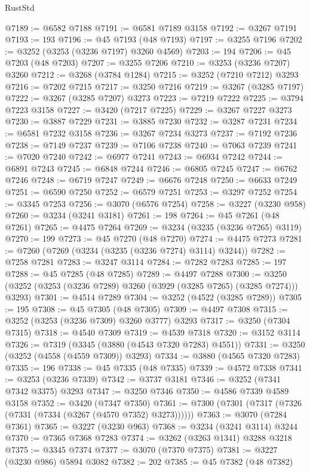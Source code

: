 \begin{lexlean}{RustStd}
\begin{coremodule}
@7189 := @6582 @7188
@7191 := @6581 @7189 @3158
@7192 := @3267 @7191
@7193 := 193
@7196 := @45 @7193 (@48 @7193)
@7197 := @3255 @7196
@7202 := @3252 (@3253 (@3236 @7197) @3260 @4569)
@7203 := 194
@7206 := @45 @7203 (@48 @7203)
@7207 := @3255 @7206
@7210 := @3253 (@3236 @7207) @3260
@7212 := @3268 (@3784 @1284)
@7215 := @3252 (@7210 @7212) @3293
@7216 := @7202 @7215
@7217 := @3250 @7216
@7219 := @3267 (@3285 @7197)
@7222 := @3267 (@3285 @7207) @3273
@7223 := @7219 @7222
@7225 := @3794 @7223 @3158
@7227 := @3420 (@7217 @7225)
@7229 := @3267 @7227 @3273
@7230 := @3887 @7229
@7231 := @3885 @7230
@7232 := @3287 @7231
@7234 := @6581 @7232 @3158
@7236 := @3267 @7234 @3273
@7237 := @7192 @7236
@7238 := @7149 @7237
@7239 := @7106 @7238
@7240 := @7063 @7239
@7241 := @7020 @7240
@7242 := @6977 @7241
@7243 := @6934 @7242
@7244 := @6891 @7243
@7245 := @6848 @7244
@7246 := @6805 @7245
@7247 := @6762 @7246
@7248 := @6719 @7247
@7249 := @6676 @7248
@7250 := @6633 @7249
@7251 := @6590 @7250
@7252 := @6579 @7251
@7253 := @3297 @7252
@7254 := @3345 @7253
@7256 := @3070 (@6576 @7254)
@7258 := @3227 (@3230 @958)
@7260 := @3234 (@3241 @3181)
@7261 := 198
@7264 := @45 @7261 (@48 @7261)
@7265 := @4475 @7264
@7269 := @3234 (@3235 (@3236 @7265) @3119)
@7270 := 199
@7273 := @45 @7270 (@48 @7270)
@7274 := @4475 @7273
@7281 := @7260 (@7269 (@3234 (@3235 (@3236 @7274) @3114) @3244))
@7282 := @7258 @7281
@7283 := @3247 @3114
@7284 := @7282 @7283
@7285 := 197
@7288 := @45 @7285 (@48 @7285)
@7289 := @4497 @7288
@7300 := @3250 (@3252 (@3253 (@3236 @7289) @3260 (@3929 (@3285 @7265) (@3285 @7274))) @3293)
@7301 := @4514 @7289
@7304 := @3252 (@4522 (@3285 @7289))
@7305 := 195
@7308 := @45 @7305 (@48 @7305)
@7309 := @4497 @7308
@7315 := @3252 (@3253 (@3236 @7309) @3260 @3777) @3293
@7317 := @3250 (@7304 @7315)
@7318 := @4540 @7309
@7319 := @4539 @7318
@7320 := @3152 @3114
@7326 := @7319 (@3345 (@3880 (@4543 @7320 @7283) @4551))
@7331 := @3250 (@3252 (@4558 (@4559 @7309)) @3293)
@7334 := @3880 (@4565 @7320 @7283)
@7335 := 196
@7338 := @45 @7335 (@48 @7335)
@7339 := @4572 @7338
@7341 := @3253 (@3236 @7339)
@7342 := @3737 @3181
@7346 := @3252 (@7341 @7342 @3375) @3293
@7347 := @3250 @7346
@7350 := @4586 @7339 @4589 @3158
@7352 := @3420 (@7347 @7350)
@7361 := @7300 (@7301 (@7317 (@7326 (@7331 (@7334 (@3267 (@4570 @7352) @3273))))))
@7363 := @3070 (@7284 @7361)
@7365 := @3227 (@3230 @963)
@7368 := @3234 (@3241 @3114) @3244
@7370 := @7365 @7368 @7283
@7374 := @3262 (@3263 @1341) @3288 @3218
@7375 := @3345 @7374
@7377 := @3070 (@7370 @7375)
@7381 := @3227 (@3230 @986) @5894 @3082
@7382 := 202
@7385 := @45 @7382 (@48 @7382)

\end{coremodule}
\end{lexlean}
